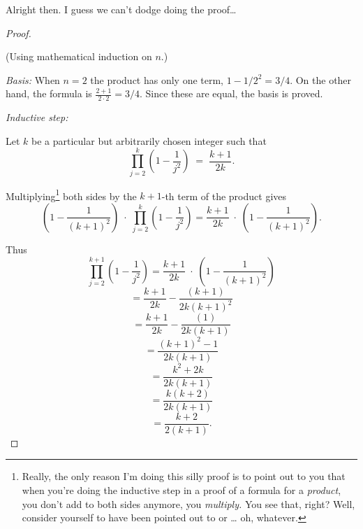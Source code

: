 \documentclass[10pt,]{book}
\theoremstyle{plain}
\theoremstyle{definition}
\theoremstyle{definition}
\numberwithin{equation}{section}
\begin{document}
    Alright then. I guess we can't dodge doing the proof\dots{}
\begin{proof}\hypertarget{proof-30}{}

      (Using mathematical induction on \(n\).)
\par

      \emph{Basis: } When \(n = 2\) the product has only one term, \(1-1/2^2 = 3/4\).
      On the other hand, the formula is
      \(\displaystyle \frac{2+1}{2\cdot2} = 3/4\). Since these are equal, the
      basis is proved.
\par

      \emph{Inductive step: }
\par

      Let \(k\) be a particular but arbitrarily chosen integer such that
      \begin{equation*}
        \prod_{j=2}^k \left( 1 - \frac{1}{j^2} \right) \;  = \; \frac{k+1}{2k}.
      \end{equation*}
\par

      Multiplying\footnote{Really, the only reason I'm doing this silly proof is to 
      point out to you that when you're doing the inductive step in a proof of a 
      formula for a \emph{product}, you don't add to both sides anymore, you \emph{multiply.} You see that, right?  Well, consider yourself to have been pointed out to or \dots{} oh, whatever.\label{fn-34}} both sides by the \(k+1\)-th term of the product
      gives
      \begin{equation*}
        \left( 1 - \frac{1}{(k+1)^2} \right) \; \cdot \; \prod_{j=2}^k \left( 1 - \frac{1}{j^2} \right)   =  \frac{k+1}{2k} \; \cdot \; \left( 1 - \frac{1}{(k+1)^2} \right).
      \end{equation*}
\par

      Thus
      \begin{equation*}
        \prod_{j=2}^{k+1} \left( 1 - \frac{1}{j^2} \right)   =  \frac{k+1}{2k} \; \cdot \; \left( 1 - \frac{1}{(k+1)^2} \right)
      \end{equation*}
      \begin{equation*}
        = \frac{k+1}{2k} - \frac{(k+1)}{2k(k+1)^2}
      \end{equation*}
      \begin{equation*}
        = \frac{k+1}{2k} - \frac{(1)}{2k(k+1)}
      \end{equation*}
      \begin{equation*}
        = \frac{(k+1)^2 - 1}{2k(k+1)}
      \end{equation*}
\begin{equation*}
      = \frac{k^2+2k}{2k(k+1)}
    \end{equation*}\begin{equation*}
      = \frac{k (k+2)}{2k(k+1)}
    \end{equation*}\begin{equation*}
      = \frac{k+2}{2(k+1)}.
    \end{equation*}\end{proof}
\typeout{************************************************}
\typeout{************************************************}
\end{document}

